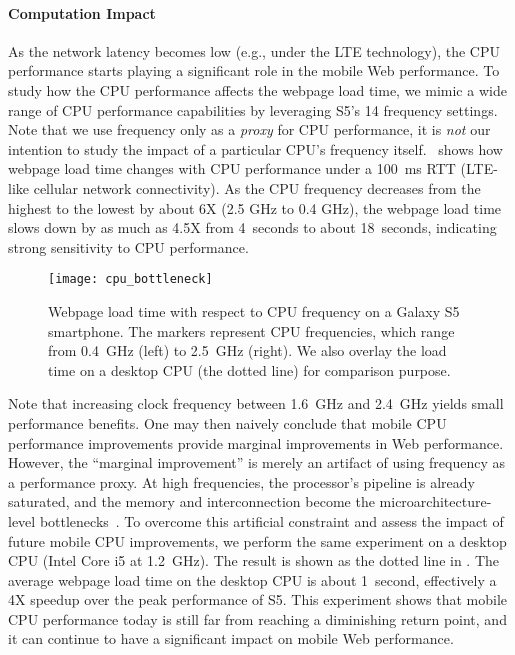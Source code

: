 \paragraph{Computation Impact} As the network latency becomes low (e.g., under the LTE technology), the CPU performance starts playing a significant role in the mobile Web performance. To study how the CPU performance affects the webpage load time, we mimic a wide range of CPU performance capabilities by leveraging S5's 14 frequency settings. Note that we use frequency only as a \textit{proxy} for CPU performance, it is \emph{not} our intention to study the impact of a particular CPU's frequency itself.~ shows how webpage load time changes with CPU performance under a 100~ms RTT (LTE-like cellular network connectivity). As the CPU frequency decreases from the highest to the lowest by about 6X (2.5 GHz to 0.4 GHz), the webpage load time slows down by as much as 4.5X from 4~seconds to about 18~seconds, indicating strong sensitivity to CPU performance.

\begin{figure}[t]
  \centering
  \texttt{[image: cpu\_bottleneck]}
  \caption{Webpage load time with respect to CPU frequency on a Galaxy S5 smartphone. The markers represent CPU frequencies, which range from 0.4~GHz (left) to 2.5~GHz (right). We also overlay the load time on a desktop CPU (the dotted line) for comparison purpose.}
  \label{fig:cpu_bottleneck}
\end{figure}

Note that increasing clock frequency between 1.6~GHz and 2.4~GHz yields small performance benefits. One may then naively conclude that mobile CPU performance improvements provide marginal improvements in Web performance. However, the ``marginal improvement'' is merely an artifact of using frequency as a performance proxy. At high frequencies, the processor's pipeline is already saturated, and the memory and interconnection become the microarchitecture-level bottlenecks~\cite{clockvsipc}. To overcome this artificial constraint and assess the impact of future mobile CPU improvements, we perform the same experiment on a desktop CPU (Intel Core i5 at 1.2~GHz). The result is shown as the dotted line in . The average webpage load time on the desktop CPU is about 1~second, effectively a 4X speedup over the peak performance of S5. This experiment shows that mobile CPU performance today is still far from reaching a diminishing return point, and it can continue to have a significant impact on mobile Web performance.

